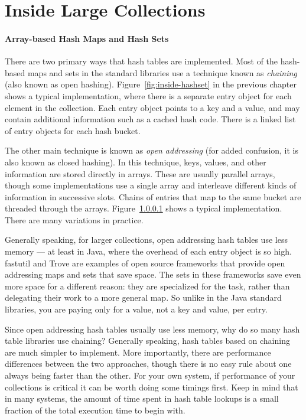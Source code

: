 \section{Inside Large Collections}
\paragraph{Array-based Hash Maps and Hash Sets}
There are two primary ways that hash tables are implemented. Most of the
hash-based maps and sets in the standard libraries use a technique known as
\emph{chaining} (also known as open hashing). Figure~\ref{fig:inside-hashset} in the previous chapter
shows a typical implementation, where there is a separate entry
object for each element in the collection. Each entry object points to a key and a value, and
may contain additional information such as a cached hash code. There is a linked list of entry objects
for each hash bucket.

The other main technique is known as \emph{open addressing} (for added
confusion, it is also known as closed hashing).  In this technique,
keys, values, and other information are stored directly in
arrays. These are usually parallel arrays, though some implementations
use a single array and interleave different kinds of information in
successive slots. Chains of entries that map to the same bucket are threaded through the arrays.
Figure~\ref{} shows a typical implementation. There are many variations in
practice.

Generally speaking, for larger collections, open addressing hash tables use less
memory --- at least in Java, where the overhead of each entry object is so high. 
fastutil and Trove are examples of open source frameworks that provide open
addressing maps and sets that save space. The sets in
these frameworks save even more space for a different reason: they are specialized for the task,
rather than delegating their work to a more general map. So unlike in the Java
standard libraries, you are paying only for a value, not a key and value, per
entry.

Since open addressing hash tables usually use less memory, why do so many hash
table libraries use chaining? Generally speaking, hash tables based
on chaining are much simpler to implement. More importantly, there
are performance differences between the two approaches, though there is no easy
rule about one always being faster than the other. For your
own system, if performance of your collections is critical it can be worth doing
some timings first.  Keep in mind that in many systems, the amount of
time spent in hash table lookups is a small fraction of the total execution time to begin with. 


